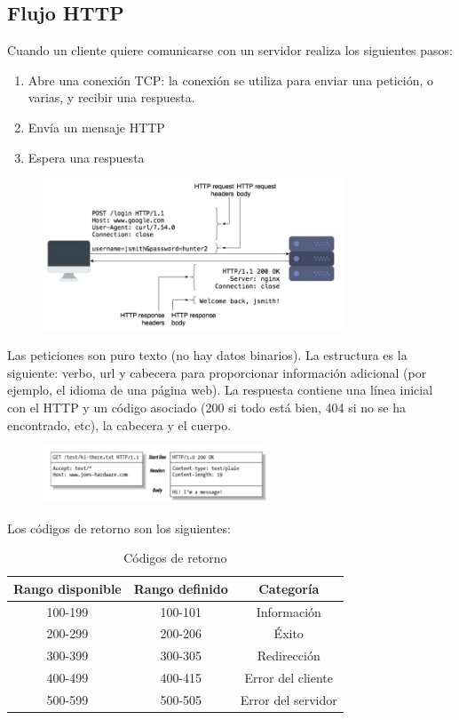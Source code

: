 \subsection{Flujo HTTP}
Cuando un cliente quiere comunicarse con un servidor realiza los siguientes pasos: 
\begin{enumerate}
\item Abre una conexión TCP: la conexión se utiliza para enviar una petición, o varias, y recibir una respuesta.
\item Envía un mensaje HTTP
\item Espera una respuesta
\end{enumerate}
\begin{figure}[htbp]
\centering
\includegraphics[width = 0.8\textwidth]{figs/http-flow.png}
\end{figure}

Las peticiones son puro texto (no hay datos binarios). La estructura es la siguiente: verbo, url y cabecera para proporcionar información adicional (por ejemplo, el idioma de una página web). La respuesta contiene una línea inicial con el HTTP y un código asociado (200 si todo está bien, 404 si no se ha encontrado, etc), la cabecera y el cuerpo.
\begin{figure}[htbp]
\centering
\includegraphics[width = 0.6\textwidth]{figs/request-answer.png}
\end{figure}

Los códigos de retorno son los siguientes:
\begin{table}[htbp]
\centering
\begin{tabular}{c | c | c}
Rango disponible & Rango definido & Categoría \\ \hline
100-199 & 100-101 & Información \\
200-299 & 200-206 & Éxito \\
300-399 & 300-305 & Redirección \\
400-499 & 400-415 & Error del cliente \\
500-599 & 500-505 & Error del servidor 
\end{tabular}
\caption{Códigos de retorno}
\end{table}

